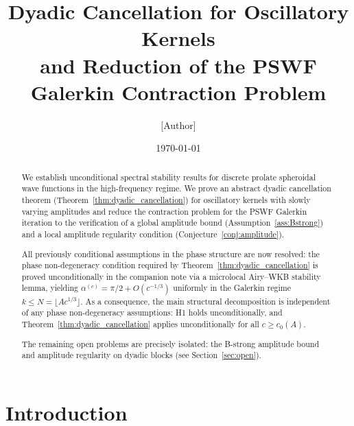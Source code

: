 \documentclass[12pt]{amsart}
\theoremstyle{definition}
\theoremstyle{remark}
\begin{document}

\title[Dyadic Cancellation for PSWF Galerkin Operators]
      {Dyadic Cancellation for Oscillatory Kernels\\and
       Reduction of the PSWF Galerkin Contraction Problem}

\author{[Author]}
\date{\today}
\maketitle

\begin{abstract}
We establish unconditional spectral stability results for
discrete prolate spheroidal wave functions in the high-frequency
regime.
We prove an abstract dyadic cancellation theorem
(Theorem~\ref{thm:dyadic_cancellation}) for oscillatory kernels
with slowly varying amplitudes and reduce the contraction problem
for the PSWF Galerkin iteration to the verification of a global
amplitude bound (Assumption~\ref{ass:Bstrong}) and a local
amplitude regularity condition (Conjecture~\ref{conj:amplitude}).

All previously conditional assumptions in the phase structure
are now resolved:
the phase non-degeneracy condition required by
Theorem~\ref{thm:dyadic_cancellation} is proved unconditionally
in the companion note \cite{PhaseNondeg}
via a microlocal Airy--WKB stability lemma,
yielding $\alpha^{(c)} = \pi/2 + O(c^{-1/3})$
uniformly in the Galerkin regime $k \le N = \lfloor Ac^{1/3}\rfloor$.
As a consequence, the main structural decomposition is
independent of any phase non-degeneracy assumptions:
H1 holds unconditionally, and
Theorem~\ref{thm:dyadic_cancellation} applies unconditionally
for all $c \ge c_0(A)$.

The remaining open problems are precisely isolated:
the B-strong amplitude bound and amplitude regularity
on dyadic blocks (see Section~\ref{sec:open}).
\end{abstract}

\section{Introduction}
\label{sec:intro}
\end{document}
